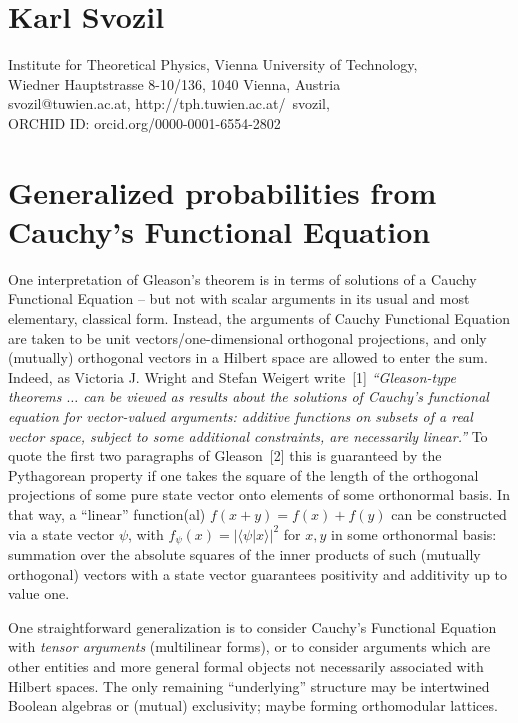 \documentclass[english]{article}
\begin{document}
\thispagestyle{empty}


\section*{Karl Svozil}



{Institute for Theoretical Physics, Vienna  University of Technology,\\
Wiedner Hauptstrasse 8-10/136,
1040 Vienna,  Austria} \\
{svozil@tuwien.ac.at},
{http://tph.tuwien.ac.at/~svozil}, \\
ORCHID ID: orcid.org/0000-0001-6554-2802

\section*{Generalized probabilities from Cauchy's Functional Equation}


One interpretation of Gleason's theorem is in terms of solutions of a Cauchy Functional Equation -- but not with scalar arguments in its usual and most elementary, classical form.
Instead, the  arguments of Cauchy Functional Equation are taken to be unit vectors/one-dimensional orthogonal projections, and only  (mutually) orthogonal vectors in a Hilbert space are allowed to enter the sum.
Indeed, as Victoria J. Wright and Stefan Weigert write~[1] {\em ``Gleason-type theorems $\ldots$ can be viewed as results about the solutions of Cauchy's functional equation for vector-valued arguments: additive functions on subsets of a real vector space, subject to some additional constraints, are necessarily linear.''}
To quote the first two paragraphs of Gleason~[2] this is guaranteed by the Pythagorean property if one takes the square of the length of the orthogonal projections of some pure state vector onto elements of some orthonormal basis. In that way, a ``linear'' function(al) $f(x+y)=f(x)+f(y)$ can be constructed via a state vector $\psi$,  with $f_\psi(x)= \vert \langle \psi | x\rangle\vert^2$ for $x,y$ in some orthonormal basis: summation over the absolute squares of  the inner products of such (mutually orthogonal) vectors with a state vector guarantees positivity and additivity up to value one.

One straightforward generalization is to consider Cauchy's Functional Equation with {\em tensor arguments} (multilinear forms), or to consider arguments which are other entities and more general formal objects not necessarily associated with Hilbert spaces. The only remaining ``underlying'' structure may be intertwined Boolean algebras or (mutual) exclusivity; maybe forming orthomodular lattices.
\end{document}
